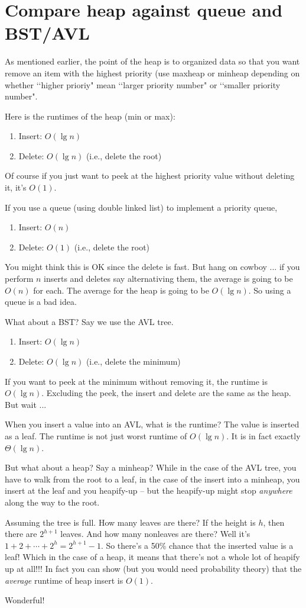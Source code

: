 \section{Compare heap against queue and BST/AVL}

As mentioned earlier, the point of the heap is to
organized data so that you want remove an item
with the highest priority (use maxheap or minheap depending
on whether \lq\lq higher prioriy" mean \lq\lq larger priority number"
or \lq\lq smaller priority number".

Here is the runtimes of the heap (min or max):
\begin{enumerate}[nosep]
\item Insert: $O(\lg n)$
\item Delete: $O(\lg n)$ (i.e., delete the root)
\end{enumerate}
Of course if you just want to peek at the highest priority value without deleting it,
it's $O(1)$.

If you use a queue (using double linked list) to implement a 
priority queue,
\begin{enumerate}[nosep]
\item Insert: $O(n)$
\item Delete: $O(1)$ (i.e., delete the root)
\end{enumerate}
You might think this is OK since the delete is fast.
But hang on cowboy ... if you perform $n$ inserts and deletes 
say alternativing them, the average is going to be $O(n)$ for each.
The average for the heap is going to be $O(\lg n)$.
So using a queue is a bad idea.

What about a BST? Say we use the AVL tree.
\begin{enumerate}[nosep]
\item Insert: $O(\lg n)$
\item Delete: $O(\lg n)$ (i.e., delete the minimum)
\end{enumerate}
If you want to peek at the minimum without removing it,
the runtime is $O(\lg n)$.
Excluding the peek, the insert and delete are the 
same as the heap.
But wait ...

When you insert a value into an AVL, what is the runtime?
The value is inserted as a leaf. The runtime is not just worst
runtime of $O(\lg n)$. It is in fact exactly $\Theta(\lg n)$.

But what about a heap? Say a minheap?
While in the case of the AVL tree, you have to walk from the root
to a leaf, in the case of the insert into a minheap,
you insert at the leaf and you heapify-up -- but the
heapify-up might stop \textit{anywhere} along the way to the root.

Assuming the tree is full.
How many leaves are there? If the height is $h$,
then there are $2^{h + 1}$ leaves.
And how many nonleaves are there?
Well it's $1 + 2 + \cdots + 2^{h} = 2^{h+1} - 1$.
So there's a 50\% chance that the inserted value is a leaf!
Which in the case of a heap, it means that there's not
a whole lot of heapify up at all!!!
In fact you can show (but you would need probability theory)
that the \textit{average} runtime of heap insert is $O(1)$.

Wonderful! 
